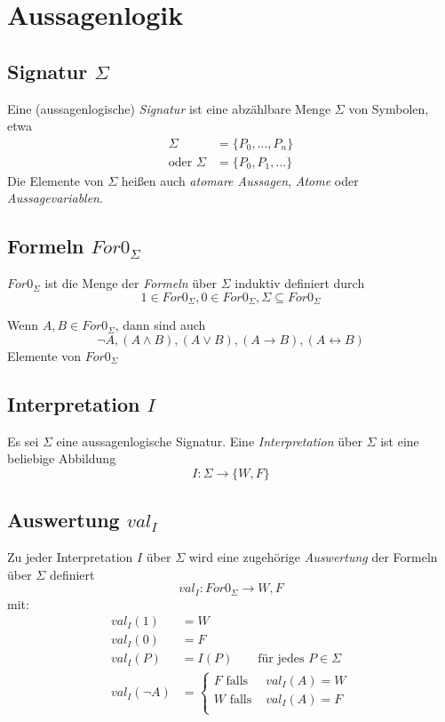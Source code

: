 \documentclass{article}
\begin{document}
\section{Aussagenlogik}
\subsection{Signatur $\Sigma$}
Eine (aussagenlogische) \textit{Signatur} ist eine abz\"ahlbare Menge $\Sigma$
von Symbolen, etwa
\begin{align*}
    \Sigma &= \{P_0 , \dots, P_n \} \\ 
    \text{oder } \Sigma &= \{P_0 , P_1, \dots\}
\end{align*}
Die Elemente von $\Sigma$ hei{\ss}en auch \textit{atomare Aussagen}, \textit{Atome}
oder \textit{Aussagevariablen}.

\subsection{Formeln $For0_\Sigma$}
$For0_\Sigma$ ist die Menge der \textit{Formeln} \"uber $\Sigma$
induktiv definiert durch
\[ 1 \in For0_\Sigma, 0 \in For0_\Sigma, \Sigma \subseteq For0_\Sigma \]

Wenn $A, B \in For0_\Sigma$, dann sind auch
\[ \lnot A, (A \land B), (A \lor B), (A \rightarrow B), (A \leftrightarrow B) \]
Elemente von $For0_\Sigma$

\subsection{Interpretation $I$}
Es sei $\Sigma$ eine aussagenlogische Signatur. Eine \textit{Interpretation}
\"uber $\Sigma$ ist eine beliebige Abbildung
\[ I : \Sigma \rightarrow \{W, F \} \]

\subsection{Auswertung $val_I$}
Zu jeder Interpretation $I$ \"uber $\Sigma$ wird eine zugeh\"orige \textit{Auswertung} der Formeln \"uber $\Sigma$ definiert
\[ val_I : For0_\Sigma \rightarrow {W, F} \]
mit:
\begin{align*}
    val_I(1) &= W \\
    val_I(0) &= F \\
    val_I(P) &= I(P) \qquad \text{f\"ur jedes } P \in \Sigma \\
    val_I(\lnot A) &=  \begin{cases}
        F \text{ falls } &val_I(A) = W \\
        W \text{ falls } &val_I(A) = F \\
    \end{cases}
\end{align*}
\end{document}
